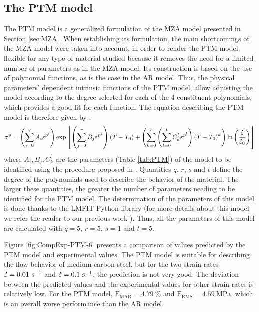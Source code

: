 \documentclass[twoside,english,1p,final,sort&compress]{elsarticle}
\theoremstyle{plain}
\DeclareRobustCommand{\mdot}[1]{\accentset{\mbox{\bfseries .}}{#1}}
\DeclareRobustCommand{\RMSE}{\text{E}_\text{RMS}}
\DeclareRobustCommand{\MARE}{\text{E}_\text{MAR}}
\DeclareRobustCommand{\ps}{\text{s}^{-1}}
\DeclareRobustCommand{\MPa}{\text{MPa}}
\begin{document}
\subsection{The PTM model\label{sec:PTM}}

The PTM model \cite{TizeMha-2022} is a generalized formulation of the MZA model presented in Section \ref{sec:MZA}.
When establishing its formulation, the main shortcomings of the MZA model were taken into account, in order to render the PTM model flexible for any type of material studied because it removes the need for a limited number of parameters as in the MZA model.
Its construction is based on the use of polynomial functions, as is the case in the AR model.
Thus, the physical parameters' dependent intrinsic functions of the PTM model, allow adjusting the model according to the degree selected for each of the 4 constituent polynomials, which provides a good fit for each function.
The equation describing the PTM model is therefore given by :
\begin{equation}
\label{eq:PTM-model}
\sigma^y = \left(\sum_{i=0}^{q}{A_i\varepsilon^{p^i}}\right) \exp\left[\left(\sum_{j=0}^{r}{B_j\varepsilon^{p^j}}\right)\left(T-T_0\right) + \left(\sum_{k=0}^{s}\left(\sum_{l=0}^{t}{C_k^l\varepsilon^{p^l}} \right)\left(T-T_0\right)^k \right)\ln\left( \frac{\mdot\varepsilon}{\mdot{\varepsilon}_0}\right)\right]
\end{equation}
where $A_i, B_j, C_k^l$ are the parameters (Table \ref{tab:PTM}) of the model to be identified using the procedure proposed in \cite{TizeMha-2022}.
Quantities $q$, $r$, $s$ and $t$ define the degree of the polynomials used to describe the behavior of the material.
The larger these quantities, the greater the number of parameters needing to be identified for the PTM model.
The determination of the parameters of this model is done thanks to the LMFIT Python library \cite{Newville-2016} (for more details about this model we refer the reader to our previous work \cite{TizeMha-2022}).
Thus, all the parameters of this model are calculated with $q=5$, $r=5$, $s=1$ and $t=5$.

Figure \ref{fig:CompExp-PTM-6} presents a comparison of values predicted by the PTM model and experimental values.
The PTM model is suitable for describing the flow behavior of medium carbon steel, but for the two strain rates $\mdot\varepsilon=0.01~\ps$ and $\mdot\varepsilon=0.1~\ps$, the prediction is not very good.
The deviation between the predicted values and the experimental values for other strain rates is relatively low.
For the PTM model, $\MARE=4.79~\%$ and $\RMSE=4.59~\MPa$, which is an overall worse performance than the AR model.
\end{document}
